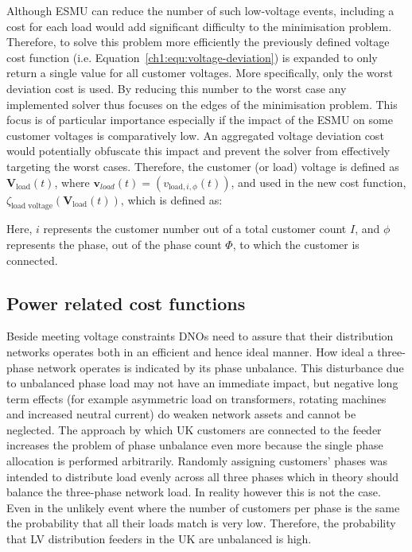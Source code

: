 Although ESMU can reduce the number of such low-voltage events, including a cost for each load would add significant difficulty to the minimisation problem.
Therefore, to solve this problem more efficiently the previously defined voltage cost function (i.e. Equation~\ref{ch1:equ:voltage-deviation}) is expanded to only return a single value for all customer voltages.
More specifically, only the worst deviation cost is used.
By reducing this number to the worst case any implemented solver thus focuses on the edges of the minimisation problem.
This focus is of particular importance especially if the impact of the ESMU on some customer voltages is comparatively low.
An aggregated voltage deviation cost would potentially obfuscate this impact and prevent the solver from effectively targeting the worst cases.
Therefore, the customer (or load) voltage is defined as $\textbf{V}_\text{load}(t)$, where $\textbf{v}_{load}(t) = (v_{\text{load},i,\phi}(t))$, and used in the new cost function, $\zeta_\text{load voltage}(\textbf{V}_\text{load}(t))$, which is defined as:



Here, $i$ represents the customer number out of a total customer count $I$, and $\phi$ represents the phase, out of the phase count $\Phi$, to which the customer is connected.

\subsection{Power related cost functions}
\label{ch1:subsec:powers-related-cost-functions}

Beside meeting voltage constraints DNOs need to assure that their distribution networks operates both in an efficient and hence ideal manner.
How ideal a three-phase network operates is indicated by its phase unbalance.
This disturbance due to unbalanced phase load may not have an immediate impact, but negative long term effects (for example asymmetric load on transformers, rotating machines and increased neutral current) do weaken network assets and cannot be neglected.
The approach by which UK customers are connected to the feeder increases the problem of phase unbalance even more because the single phase allocation is performed arbitrarily.
Randomly assigning customers' phases was intended to distribute load evenly across all three phases which in theory should balance the three-phase network load.
In reality however this is not the case.
Even in the unlikely event where the number of customers per phase is the same the probability that all their loads match is very low.
Therefore, the probability that LV distribution feeders in the UK are unbalanced is high.

